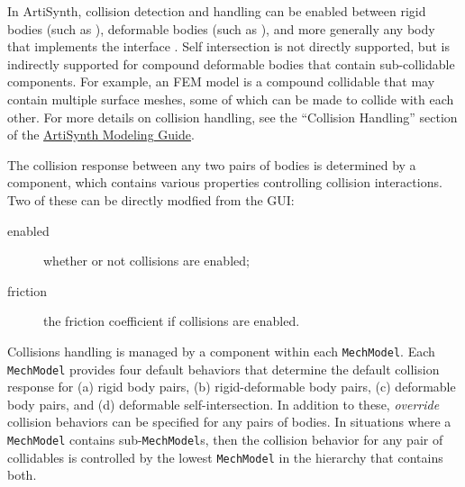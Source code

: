 \documentclass{article}
\begin{document}
In ArtiSynth, collision detection and handling can be enabled between
rigid bodies (such as
), deformable bodies
(such as ), and more
generally any body that implements the interface
.  Self intersection
is not directly supported, but is indirectly supported for compound
deformable bodies that contain sub-collidable components. For example,
an FEM model is a compound collidable that may contain multiple
surface meshes, some of which can be made to collide with each other.
For more details on collision handling, see the ``Collision Handling''
section of the
\href{\artisynthDocBase/html/modelguide/modelguide.html}{ArtiSynth
Modeling Guide}.

The collision response between any two pairs of bodies is determined
by a 
component, which contains various properties controlling collision
interactions. Two of these can be directly modfied from the GUI:

\begin{description}

\item[enabled]\mbox{}

whether or not collisions are enabled;

\item[friction]\mbox{}

the friction coefficient if collisions are enabled.	

\end{description}

Collisions handling is managed by
a  component
within each {\tt MechModel}.  Each {\tt MechModel} provides four
default behaviors that determine the default collision response for
(a) rigid body pairs, (b) rigid-deformable body pairs, (c) deformable
body pairs, and (d) deformable self-intersection. In addition to
these, {\it override} collision behaviors can be specified for any
pairs of bodies.  In situations where a {\tt MechModel} contains
sub-{\tt MechModel}s, then the collision behavior for any pair of
collidables is controlled by the lowest {\tt MechModel} in the
hierarchy that contains both.
\end{document}
